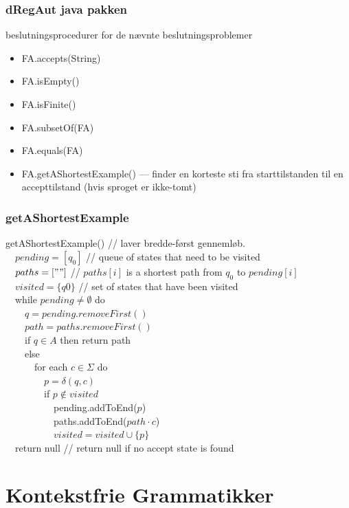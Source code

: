 \documentclass{beamer}
\begin{document}
\begin{frame}
\frametitle{dRegAut java pakken}
beslutningsprocedurer for de 
nævnte beslutningsproblemer
\begin{itemize}
\item  FA.accepts(String) 
\item  FA.isEmpty() 
\item  FA.isFinite() 
\item  FA.subsetOf(FA) 
\item  FA.equals(FA)
  \pause
\item  FA.getAShortestExample() --- finder en korteste sti fra starttilstanden til en  
   accepttilstand (hvis sproget er ikke-tomt)  
\end{itemize}
\end{frame}

\begin{frame}
\frametitle{getAShortestExample}
\small{
getAShortestExample() // laver bredde-først gennemløb.\\
\pause
\ \ $pending = [ q_0 ]$ // queue of states that need to be visited\\
\ \ $paths = [ "" ]$  // $paths[i]$ is a shortest path from $q_0$ to $pending[i]$\\
\ \ $visited = \{ q0 \}$  // set of states that have been visited \\
\pause
\ \ while $pending\neq \emptyset$ do\\
\ \ \ \ $q = pending.removeFirst()$\\
\ \ \ \ $path = paths.removeFirst()$\\  
\ \ \ \ if $q\in A$ then return path\\
\ \ \ \ else\\
\pause
\ \ \ \ \ \ for each $c\in\Sigma$ do \\
\ \ \ \ \ \ \ \ $p = \delta(q, c)$\\
\pause
\ \ \ \ \ \ \ \ if $p\not\in visited$\\
\ \ \ \ \ \ \ \ \ \ pending.addToEnd($p$)\\ 
\ \ \ \ \ \ \ \ \ \ paths.addToEnd($path\cdot c$)\\ 
\ \ \ \ \ \ \ \ \ \ $visited = visited \cup \{p\}$\\
\pause
\ \ return null      // return null if no accept state is found \\
}
\end{frame}

\section{Kontekstfrie Grammatikker}
\end{document}
